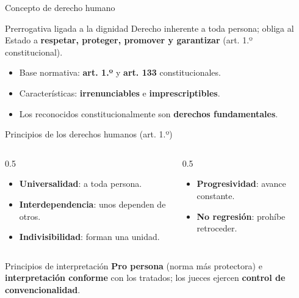 \documentclass[
  spanish,
  aspectratio=169,
  xcolor={dvipsnames,table}
]{beamer}
\begin{document}
\begin{frame}{Concepto de derecho humano}
  \begin{block}{Prerrogativa ligada a la dignidad}
    Derecho inherente a toda persona; obliga al Estado a \textbf{respetar, proteger, promover y garantizar} (art. 1.º constitucional).
  \end{block}
  \begin{itemize}
    \item Base normativa: \textbf{art. 1.º} y \textbf{art. 133} constitucionales.
    \item Características: \textbf{irrenunciables} e \textbf{imprescriptibles}.
    \item Los reconocidos constitucionalmente son \textbf{derechos fundamentales}.
  \end{itemize}
\end{frame}

\begin{frame}{Principios de los derechos humanos (art. 1.º)}
  \begin{columns}[T]
    \begin{column}{0.5\linewidth}
      \begin{itemize}
        \item \textbf{Universalidad}: a toda persona.
        \item \textbf{Interdependencia}: unos dependen de otros.
        \item \textbf{Indivisibilidad}: forman una unidad.
      \end{itemize}
    \end{column}
    \begin{column}{0.5\linewidth}
      \begin{itemize}
        \item \textbf{Progresividad}: avance constante.
        \item \textbf{No regresión}: prohíbe retroceder.
      \end{itemize}
    \end{column}
  \end{columns}
  \vspace{0.2cm}
  \begin{block}{Principios de interpretación}
    \textbf{Pro persona} (norma más protectora) e \textbf{interpretación conforme} con los tratados; los jueces ejercen \textbf{control de convencionalidad}.
  \end{block}
\end{frame}
\end{document}

